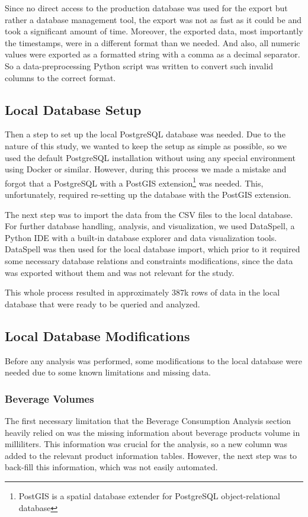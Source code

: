 Since no direct access to the production database was used for the export but rather a database management tool, the export was not as fast as it could be and took a significant amount of time.
Moreover, the exported data, most importantly the timestamps, were in a different format than we needed.
And also, all numeric values were exported as a formatted string with a comma as a decimal separator.
So a data-preprocessing Python script was written to convert such invalid columns to the correct format.

\subsection{Local Database Setup}
\label{subsec:data-methodology-local-database-setup}
Then a step to set up the local PostgreSQL database was needed.
Due to the nature of this study, we wanted to keep the setup as simple as possible, so we used the default PostgreSQL installation without using any special environment using Docker or similar.
However, during this process we made a mistake and forgot that a PostgreSQL with a PostGIS extension\footnote{PostGIS is a spatial database extender for PostgreSQL object-relational database\cite{postgis_postgis_net}} was needed.
This, unfortunately, required re-setting up the database with the PostGIS extension.

The next step was to import the data from the CSV files to the local database.
For further database handling, analysis, and visualization, we used DataSpell, a Python IDE with a built-in database explorer and data visualization tools.
DataSpell was then used for the local database import, which prior to it required some necessary database relations and constraints modifications, since the data was exported without them and was not relevant for the study.

This whole process resulted in approximately 387k rows of data in the local database that were ready to be queried and analyzed.

\subsection{Local Database Modifications}
\label{subsec:data-methodology-local-database-modifications}
Before any analysis was performed, some modifications to the local database were needed due to some known limitations and missing data.

\subsubsection{Beverage Volumes}
\label{subsubsec:data-methodology-local-database-modifications-volume}
The first necessary limitation that the Beverage Consumption Analysis section heavily relied on was the missing information about beverage products volume in milliliters.
This information was crucial for the analysis, so a new column was added to the relevant product information tables.
However, the next step was to back-fill this information, which was not easily automated.

